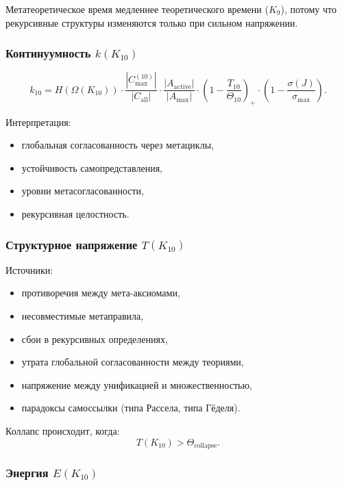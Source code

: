 Метатеоретическое время медленнее теоретического времени ($K_9$), потому что рекурсивные структуры изменяются только при сильном напряжении.

\subsubsection{Континуумность $k(K_{10})$}

\[
k_{10} =
H(\Omega(K_{10}))
\cdot
\frac{|C_{\max}^{(10)}|}{|C_{\mathrm{all}}|}
\cdot
\frac{|A_{\mathrm{active}}|}{|A_{\max}|}
\cdot
\left(1-\frac{T_{10}}{\Theta_{10}}\right)_+
\cdot
\left(1-\frac{\sigma(J)}{\sigma_{\max}}\right).
\]

Интерпретация:
\begin{itemize}
    \item глобальная согласованность через метациклы,
    \item устойчивость самопредставления,
    \item уровни метасогласованности,
    \item рекурсивная целостность.
\end{itemize}

\subsubsection{Структурное напряжение $T(K_{10})$}

Источники:
\begin{itemize}
    \item противоречия между мета-аксиомами,
    \item несовместимые метаправила,
    \item сбои в рекурсивных определениях,
    \item утрата глобальной согласованности между теориями,
    \item напряжение между унификацией и множественностью,
    \item парадоксы самоссылки (типа Рассела, типа Гёделя).
\end{itemize}

Коллапс происходит, когда:
\[
T(K_{10}) > \Theta_{\mathrm{collapse}}.
\]

\subsubsection{Энергия $E(K_{10})$}

